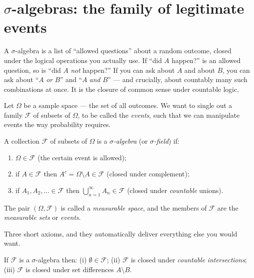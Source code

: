 \section{$\sigma$-algebras: the family of legitimate events}
\label{ch36:sigma-algebra}

\begin{intuitionbox}
A $\sigma$-algebra is a list of ``allowed questions'' about a random outcome,
closed under the logical operations you actually use. If ``did $A$ happen?'' is an
allowed question, so is ``did $A$ \emph{not} happen?'' If you can ask about $A$
and about $B$, you can ask about ``$A$ \emph{or} $B$'' and ``$A$ \emph{and} $B$''
--- and crucially, about countably many such combinations at once. It is the
closure of common sense under countable logic.
\end{intuitionbox}

Let $\Omega$ be a sample space --- the set of all outcomes. We want to single out
a family $\mathcal{F}$ of subsets of $\Omega$, to be called the \emph{events},
such that we can manipulate events the way probability requires.

\begin{definition}
\label{ch36:sigma-def}
A collection $\mathcal{F}$ of subsets of $\Omega$ is a \emph{$\sigma$-algebra} (or
\emph{$\sigma$-field}) if:
\begin{enumerate}
  \item $\Omega \in \mathcal{F}$ \quad(the certain event is allowed);
  \item if $A \in \mathcal{F}$ then $A^c = \Omega \setminus A \in \mathcal{F}$
        \quad(closed under complement);
  \item if $A_1, A_2, \dots \in \mathcal{F}$ then
        $\bigcup_{n=1}^{\infty} A_n \in \mathcal{F}$
        \quad(closed under \emph{countable} unions).
\end{enumerate}
The pair $(\Omega, \mathcal{F})$ is called a \emph{measurable space}, and the
members of $\mathcal{F}$ are the \emph{measurable sets} or \emph{events}.
\end{definition}

Three short axioms, and they automatically deliver everything else you would want.

\begin{proposition}
\label{ch36:closure}
If $\mathcal{F}$ is a $\sigma$-algebra then:
(i) $\emptyset \in \mathcal{F}$;
(ii) $\mathcal{F}$ is closed under \emph{countable intersections};
(iii) $\mathcal{F}$ is closed under set differences $A \setminus B$.
\end{proposition}

